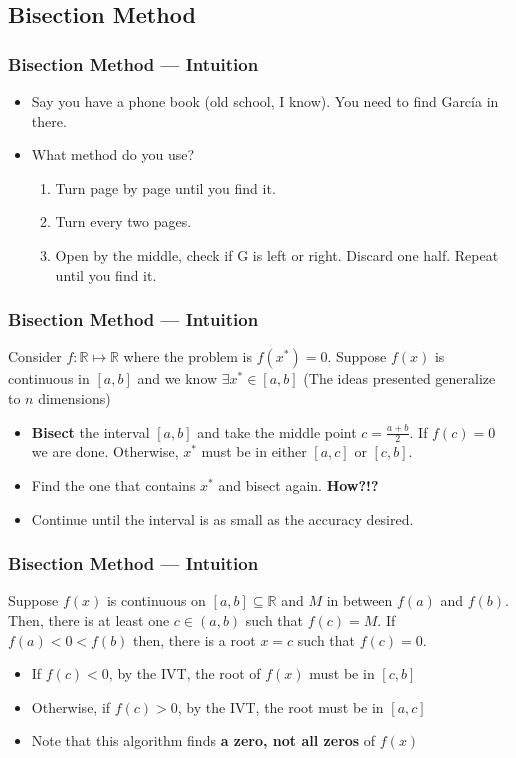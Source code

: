 \documentclass[11pt,xcolor={svgnames},aspectratio=169,usepdftitle=false]{beamer}
\begin{document}
\subsection{Bisection Method}

\begin{frame}[c]
  \frametitle{Bisection Method --- Intuition}
 \begin{itemize}
  \item Say you have a phone book (old school, I know). You need to find Garc\'ia in there.
  \item What method do you use?
  \pause
  \begin{enumerate}
    \item Turn page by page until you find it.
    \pause
    \item Turn every two pages. 
    \pause
    \item Open by the middle, check if G is left or right. Discard one half. Repeat until you find it.
  \end{enumerate}
 \end{itemize} 
\end{frame}

\begin{frame}
  \frametitle{Bisection Method --- Intuition}
Consider $f : \mathbb{R} \mapsto \mathbb{R}$ where the problem is $f(x^*) = 0$. Suppose $f(x)$ is continuous in $[a,b]$ and we know $\exists x^*\in[a,b]$ {\tiny (The ideas presented generalize to $n$ dimensions)}

\begin{itemize}
  \item \alert{\textbf{Bisect}} the interval $[a,b]$ and take the middle point $c = \frac{a + b}{2}$. If $f(c) = 0$ we are done. Otherwise, $x^*$ must be in either $[a,c]$ or $[c,b]$.
  \item Find the one that contains $x^*$ and bisect again. \alert{\textbf{How?!?}}
  \item Continue until the interval is as small as the accuracy desired.
\end{itemize}
\end{frame}

\begin{frame}
  \frametitle{Bisection Method --- Intuition}
\begin{theorem}
Suppose $f(x)$ is continuous on $[a,b]\subseteq\mathbb{R}$ and $M$ in between $f(a)$ and $f(b)$. Then, there is at least one $c\in(a,b)$ such that $f(c) = M$. If $f(a) < 0 < f(b)$ then, there is a root $x = c$ such that $f(c) = 0$.
\end{theorem}

\begin{itemize}
  \item If $f(c) < 0$, by the IVT, the root of $f(x)$ must be in $[c,b]$
  \item Otherwise, if $f(c) > 0$, by the IVT, the root must be in $[a,c]$
  \item Note that this algorithm finds \alert{\textbf{a zero, not all zeros}} of $f(x)$
\end{itemize}
\end{frame}
\end{document}
